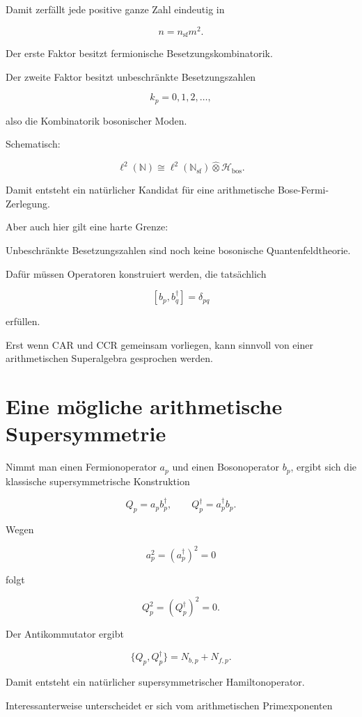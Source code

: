 \documentclass[11pt,a4paper]{article}
\begin{document}
Damit zerfällt jede positive ganze Zahl eindeutig in


\[
n=n_{\mathrm{sf}}m^2.
\]


Der erste Faktor besitzt fermionische Besetzungskombinatorik.


Der zweite Faktor besitzt unbeschränkte Besetzungszahlen


\[
k_p=0,1,2,\ldots,
\]


also die Kombinatorik bosonischer Moden.


Schematisch:


\[
\ell^2(\mathbb N)
\cong
\ell^2(\mathbb N_{\mathrm{sf}})
\widehat\otimes
\mathcal H_{\mathrm{bos}}.
\]


Damit entsteht ein natürlicher Kandidat für eine arithmetische Bose-Fermi-Zerlegung.


Aber auch hier gilt eine harte Grenze:


Unbeschränkte Besetzungszahlen sind noch keine bosonische Quantenfeldtheorie.


Dafür müssen Operatoren konstruiert werden, die tatsächlich


\[
[b_p,b_q^\dagger]
=
\delta_{pq}
\]


erfüllen.


Erst wenn CAR und CCR gemeinsam vorliegen, kann sinnvoll von einer arithmetischen Superalgebra gesprochen werden.





\section{Eine mögliche arithmetische Supersymmetrie}


Nimmt man einen Fermionoperator \(a_p\) und einen Bosonoperator \(b_p\), ergibt sich die klassische supersymmetrische Konstruktion


\[
Q_p=a_pb_p^\dagger,
\qquad
Q_p^\dagger=a_p^\dagger b_p.
\]


Wegen


\[
a_p^2=(a_p^\dagger)^2=0
\]


folgt


\[
Q_p^2=(Q_p^\dagger)^2=0.
\]


Der Antikommutator ergibt


\[
\{Q_p,Q_p^\dagger\}
=
N_{b,p}+N_{f,p}.
\]


Damit entsteht ein natürlicher supersymmetrischer Hamiltonoperator.


Interessanterweise unterscheidet er sich vom arithmetischen Primexponenten
\end{document}
